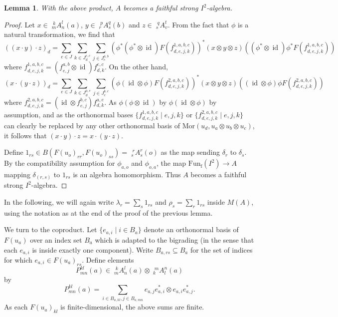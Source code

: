 \documentclass[12pt]{article}
\theoremstyle{change}
\DeclareMathOperator{\id}{id}
\DeclareMathOperator{\fin}{\mathrm{f}}
\newcommand{\Mor}{\mathrm{Mor}}
\newcommand{\Gr}[5]{\;{}^{\;#2}_{#4}#1_{#5}^{#3}}%
\newcommand{\Fun}{\mathrm{Fun}}
\newcommand{\Ff}{\Fun_{\fin}}
\newtheorem{Lem}[Theorem]{Lemma}
\theoremstyle{definition}
\numberwithin{equation}{section}
\begin{document}
\begin{Lem} With the above product, $A$ becomes a faithful strong $I^2$-algebra.
\end{Lem}

\begin{proof} Let $x\in \Gr{A}{k}{l}{m}{n}(a)$, $y\in \Gr{A}{p}{q}{r}{s}(b)$ and $z\in \Gr{A}{q}{t}{s}{v}$. From the fact that $\phi$ is a natural transformation, we find that \[((x\cdot y)\cdot z)_d = \sum_{e\in J}\sum_{k\in J_d^{e,c}}\sum_{j\in J_e^{a,b}} \left(\phi^*(\phi^*\otimes \id)F(f_{d,e,j,k}^{1,a,b,c})\right)^*(x\otimes y\otimes z)\left((\phi^*\otimes \id)\phi^* F(f_{d,e,j,k}^{1,a,b,c})\right)\] where $f_{d,e,j,k}^{1,a,b,c}=(f_{e,j}^{a,b}\otimes \id)f_{d,k}^{e,c}$. On the other hand, \[(x\cdot (y\cdot z))_d = \sum_{e\in J}\sum_{k\in J_d^{a,e}}\sum_{j\in J_e^{b,c}} \left(\phi(\id\otimes \phi)F(f_{d,e,j,k}^{2,a,b,c})\right)^*(x\otimes y\otimes z)\left((\id\otimes \phi)\phi F(f_{d,e,j,k}^{2,a,b,c})\right)\] where $f_{d,e,j,k}^{2,a,b,c} = (\id\otimes f_{e,j}^{b,c})f_{d,k}^{a,e}$. As $\phi(\phi\otimes \id)$ by $\phi(\id\otimes \phi)$ by assumption, and as the orthonormal bases $\{f_{d,e,j,k}^{1,a,b,c}\mid e,j,k\}$ or $\{f^{2,a,b,c}_{d,e,j,k}\mid e,j,k\}$ can clearly be replaced by any other orthonormal basis of $\Mor(u_d,u_a\otimes u_b\otimes u_c)$, it follows that $(x\cdot y)\cdot z = x\cdot (y\cdot z)$.

Define $1_{rs} \in B(F(u_o)_{rr},F(u_o)_{ss}) = \Gr{A}{r}{r}{s}{s}(o)$ as the map sending $\delta_r$ to $\delta_s$. By the compatibility assumption for $\phi_{a,o}$ and $\phi_{o,a}$, the map $\Ff(I^2)\rightarrow A$ mapping $\delta_{(r,s)}$ to $1_{rs}$ is an algebra homomorphism. Thus $A$ becomes a faithful strong $I^2$-algebra.
\end{proof}

In the following, we will again write $\lambda_r = \sum_s 1_{rs}$ and $\rho_s = \sum_r 1_{rs}$ inside $M(A)$, using the notation as at the end of the proof of the previous lemma.

We turn to the coproduct. Let $\{e_{a,i}\mid i\in B_a\}$ denote an orthonormal basis of $F(u_a)$ over an index set $B_a$ which is adapted to the bigrading (in the sense that each $e_{a,i}$ is inside exactly one component). Write $B_{a,rs}\subseteq B_a$ for the set of indices for which $e_{a,i}\in F(u_a)_{rs}$. Define elements \[P^{kl}_{mn}(a)\in \Gr{A}{k}{l}{m}{n}(a) \otimes \Gr{A}{m}{n}{k}{l}(a)\] by \[P^{kl}_{mn}(a) = \sum_{i\in B_{a,kl},j\in B_{a,mn}}  e_{a,j}e_{a,i}^*\otimes e_{a,i}e_{a,j}^*.\] As each $F(u_a)_{kl}$ is finite-dimensional, the above sums are finite.
\end{document}
